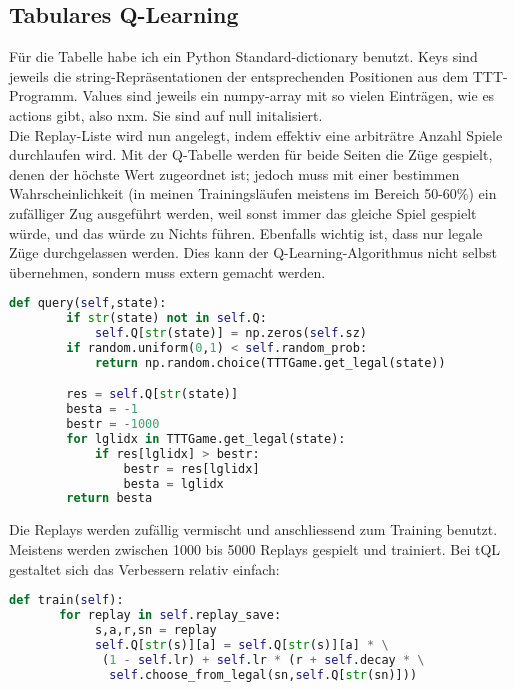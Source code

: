\documentclass[12pt,a4paper]{article}
\begin{document}
\subsection{Tabulares Q-Learning}
Für die Tabelle habe ich ein Python Standard-dictionary benutzt. Keys sind jeweils die string-Repräsentationen der entsprechenden Positionen aus dem TTT-Programm. Values sind jeweils ein numpy-array mit so vielen Einträgen, wie es actions gibt, also nxm. Sie sind auf null initalisiert.\\
Die Replay-Liste wird nun angelegt, indem effektiv eine arbiträtre Anzahl Spiele durchlaufen wird. Mit der Q-Tabelle werden für beide Seiten die Züge gespielt, denen der höchste Wert zugeordnet ist; jedoch muss mit einer bestimmen Wahrscheinlichkeit (in meinen Trainingsläufen meistens im Bereich 50-60\%) ein zufälliger Zug ausgeführt werden, weil sonst immer das gleiche Spiel gespielt würde, und das würde zu Nichts führen.
Ebenfalls wichtig ist, dass nur legale Züge durchgelassen werden. Dies kann der Q-Learning-Algorithmus nicht selbst übernehmen, sondern muss extern gemacht werden.
\begin{singlespace}
\begin{lstlisting}[language=Python,caption={Abfrage-Funktion},captionpos=b]
    def query(self,state): 
        if str(state) not in self.Q:
            self.Q[str(state)] = np.zeros(self.sz)
        if random.uniform(0,1) < self.random_prob:
            return np.random.choice(TTTGame.get_legal(state))

        res = self.Q[str(state)]
        besta = -1
        bestr = -1000
        for lglidx in TTTGame.get_legal(state):
            if res[lglidx] > bestr:
                bestr = res[lglidx]
                besta = lglidx
        return besta
\end{lstlisting}
\end{singlespace}


Die Replays werden zufällig vermischt und anschliessend zum Training benutzt. Meistens werden zwischen 1000 bis 5000 Replays gespielt und trainiert. Bei tQL gestaltet sich das Verbessern relativ einfach:
\begin{singlespace}
\begin{lstlisting}[language=Python,caption={Trainingsfunktion},captionpos=b]
    def train(self):
       for replay in self.replay_save:
            s,a,r,sn = replay
            self.Q[str(s)][a] = self.Q[str(s)][a] * \
             (1 - self.lr) + self.lr * (r + self.decay * \
              self.choose_from_legal(sn,self.Q[str(sn)]))
             
\end{lstlisting}
\end{singlespace}
\end{document}
